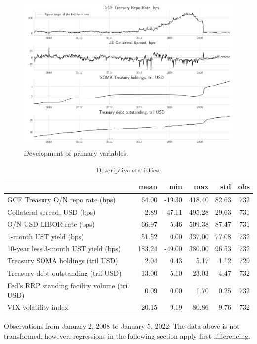 \documentclass[11pt,a4paper,english,oneside]{article}
\begin{document}
\begin{figure}[htb!]
  \begin{center}
    \caption{Development of primary variables.}
    \label{fig:vars}
    \includegraphics[width=0.99\linewidth]{main_vars.pdf}
  \end{center}
\end{figure}

\begin{table}[!h] \centering
\begin{threeparttable}
\caption{Descriptive statistics.}
\label{table:stats}
\begin{tabular}{lrrrrr}
\toprule
{} &    mean &    min &     max &    std &  obs \\
\midrule
GCF Treasury O/N repo rate (bps) &   64.00 & -19.30 &  418.40 &  82.63 &  732 \\
Collateral spread, USD (bps) &    2.89 & -47.11 &  495.28 &  29.63 &  731 \\
O/N USD LIBOR rate (bps) &   66.97 &   5.46 &  509.38 &  87.47 &  731 \\
1-month UST yield (bps) &   51.52 &   0.00 &  337.00 &  77.08 &  732 \\
10-year less 3-month UST yield (bps) &  183.24 & -49.00 &  380.00 &  96.53 &  732 \\
Treasury SOMA holdings (tril USD) &    2.04 &   0.43 &    5.17 &   1.12 &  729 \\
Treasury debt outstanding (tril USD) &   13.00 &   5.10 &   23.03 &   4.47 &  732 \\
Fed's RRP standing facility volume (tril USD) &    0.09 &   0.00 &    1.70 &   0.25 &  732 \\
VIX volatility index &   20.15 &   9.19 &   80.86 &   9.76 &  732 \\
\bottomrule
\end{tabular}
Observations from January 2, 2008 to January 5, 2022. The data above is not transformed, however, regressions in the following section apply first-differencing.
\end{threeparttable}
\end{table}
\end{document}
